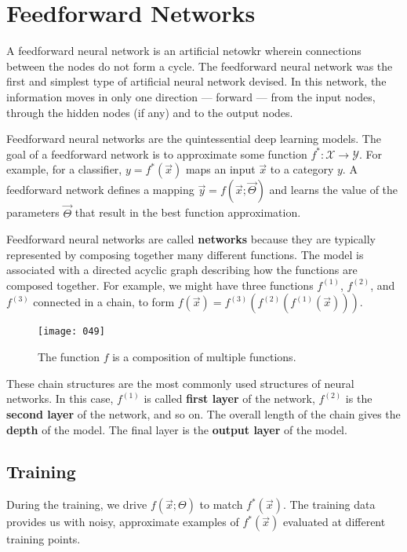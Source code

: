 \section{Feedforward Networks}
A feedforward neural network is an artificial netowkr wherein connections between the nodes do not form a cycle. The feedforward neural network was the first and simplest type of artificial neural network devised. In this network, the information moves in only one direction --- forward --- from the input nodes, through the hidden nodes (if any) and to the output nodes.

Feedforward neural networks are the quintessential deep learning models. The goal of a feedforward network is to approximate some function \(f^*: \mathcal{X} \to \mathcal{Y}\). For example, for a classifier, \(y = f^*(\vec{x})\) maps an input \(\vec{x}\) to a category \(y\). A feedforward network defines a mapping \(\vec{y} = f(\vec{x}; \vec{\Theta})\) and learns the value of the parameters \(\vec{\Theta}\) that result in the best function approximation.

Feedforward neural networks are called \textbf{networks} because they are typically represented by composing together many different functions. The model is associated with a directed acyclic graph describing how the functions are composed together. For example, we might have three functions \(f^{(1)}\), \(f^{(2)}\), and \(f^{(3)}\) connected in a chain, to form \(f(\vec{x}) = f^{(3)}(f^{(2)}(f^{(1)}(\vec{x})))\). 

\begin{figure}[h]
    \centering
    \texttt{[image: 049]}
    \caption{The function \(f\) is a composition of multiple functions.}
\end{figure}

These chain structures are the most commonly used structures of neural networks. In this case, \(f^{(1)}\) is called \textbf{first layer} of the network, \(f^{(2)}\) is the \textbf{second layer} of the network, and so on. The overall length of the chain gives the \textbf{depth} of the model. The final layer is the \textbf{output layer} of the model.

\subsection{Training}
During the training, we drive \(f(\vec{x}; \Theta)\) to match \(f^*(\vec{x})\). The training data provides us with noisy, approximate examples of \(f^*(\vec{x})\) evaluated at different training points.


